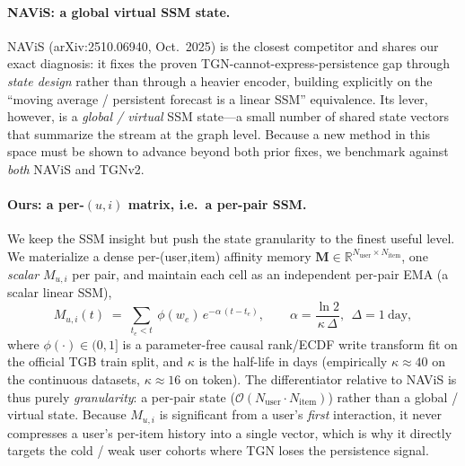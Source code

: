 \documentclass[11pt]{article}
\begin{document}
\paragraph{NAViS: a global virtual SSM state.}
NAViS (arXiv:2510.06940, Oct.\ 2025) is the closest competitor and shares our
exact diagnosis: it fixes the proven TGN-cannot-express-persistence gap through
\emph{state design} rather than through a heavier encoder, building explicitly on
the ``moving average / persistent forecast is a linear SSM'' equivalence. Its
lever, however, is a \emph{global / virtual} SSM state---a small number of
shared state vectors that summarize the stream at the graph level. Because a
new method in this space must be shown to advance beyond both prior fixes, we
benchmark against \emph{both} NAViS and TGNv2.

\paragraph{Ours: a per-\texorpdfstring{$(u,i)$}{(u,i)} matrix, i.e.\ a per-pair SSM.}
We keep the SSM insight but push the state granularity to the finest useful
level. We materialize a dense per-(user,item) affinity memory
$\mathbf{M}\in\mathbb{R}^{N_{\text{user}}\times N_{\text{item}}}$, one
\emph{scalar} $M_{u,i}$ per pair, and maintain each cell as an independent
per-pair EMA (a scalar linear SSM),
\begin{equation}
  M_{u,i}(t)\;=\;\sum_{t_e < t}\ \phi(w_e)\,e^{-\alpha\,(t-t_e)},
  \qquad \alpha=\frac{\ln 2}{\kappa\,\Delta},\ \ \Delta=1~\text{day},
  \label{eq:perpair-ssm}
\end{equation}
where $\phi(\cdot)\in(0,1]$ is a parameter-free causal rank/ECDF write transform
fit on the official TGB train split, and $\kappa$ is the half-life in days
(empirically $\kappa\!\approx\!40$ on the continuous datasets, $\kappa\!\approx\!16$
on token). The differentiator relative to NAViS is thus purely
\emph{granularity}: a per-pair state
($\mathcal{O}(N_{\text{user}}\!\cdot\!N_{\text{item}})$) rather than a global /
virtual state. Because $M_{u,i}$ is significant from a user's \emph{first}
interaction, it never compresses a user's per-item history into a single vector,
which is why it directly targets the cold / weak user cohorts where TGN loses
the persistence signal.
\end{document}

